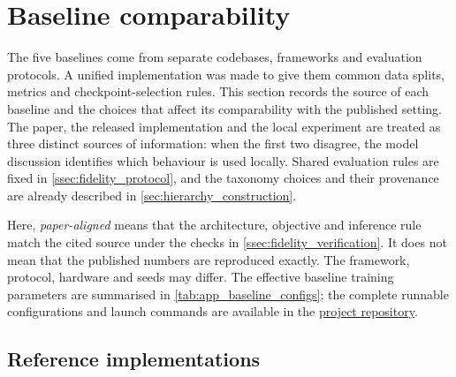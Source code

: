 \providecommand{\tbd}{\textcolor{gray}{--}}
\providecommand{\na}{\textit{n/a}}

\section{Baseline comparability}
\label{sec:fidelity}

The five baselines come from separate codebases, frameworks and evaluation
protocols. A unified implementation was made to give them common data splits, metrics and
checkpoint-selection rules. This section records the source of each baseline
and the choices that affect its comparability with the published setting.
The paper, the released implementation and the local experiment are treated as
three distinct sources of information: when the first two disagree, the model
discussion identifies which behaviour is used locally. Shared evaluation rules
are fixed in \cref{ssec:fidelity_protocol}, and the taxonomy choices and their
provenance are already described in \cref{sec:hierarchy_construction}.

Here, \emph{paper-aligned} means that the architecture, objective and inference
rule match the cited source under the checks in
\cref{ssec:fidelity_verification}. It does not mean that the published numbers
are reproduced exactly. The framework, protocol, hardware and seeds may differ.
The effective baseline training parameters are summarised in
\cref{tab:app_baseline_configs}; the complete runnable configurations and
launch commands are available in the
\href{https://github.com/Gianma23/lexicographic_deep_learning_detailed_study}{project repository}.

\subsection{Reference implementations}
\label{ssec:fidelity_anchors}


